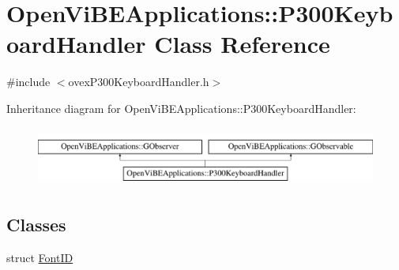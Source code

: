 \hypertarget{classOpenViBEApplications_1_1P300KeyboardHandler}{
\section{OpenViBEApplications::P300KeyboardHandler Class Reference}
\label{classOpenViBEApplications_1_1P300KeyboardHandler}
}


{\ttfamily \#include $<$ovexP300KeyboardHandler.h$>$}

Inheritance diagram for OpenViBEApplications::P300KeyboardHandler:\begin{figure}[H]
\begin{center}
\leavevmode
\includegraphics[height=1.978799cm]{classOpenViBEApplications_1_1P300KeyboardHandler}
\end{center}
\end{figure}
\subsection*{Classes}
\begin{DoxyCompactItemize}
\item 
struct \hyperlink{structOpenViBEApplications_1_1P300KeyboardHandler_1_1FontID}{FontID}
\end{DoxyCompactItemize}
